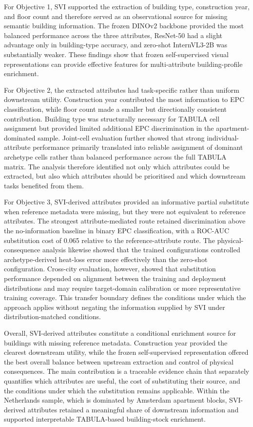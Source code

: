 For Objective 1, SVI supported the extraction of building type, construction year, and floor count and therefore served as an observational source for missing semantic building information. The frozen DINOv2 backbone provided the most balanced performance across the three attributes, ResNet-50 had a slight advantage only in building-type accuracy, and zero-shot InternVL3-2B was substantially weaker. These findings show that frozen self-supervised visual representations can provide effective features for multi-attribute building-profile enrichment.


For Objective 2, the extracted attributes had task-specific rather than uniform downstream utility. Construction year contributed the most information to EPC classification, while floor count made a smaller but directionally consistent contribution. Building type was structurally necessary for TABULA cell assignment but provided limited additional EPC discrimination in the apartment-dominated sample. Joint-cell evaluation further showed that strong individual-attribute performance primarily translated into reliable assignment of dominant archetype cells rather than balanced performance across the full TABULA matrix. The analysis therefore identified not only which attributes could be extracted, but also which attributes should be prioritised and which downstream tasks benefited from them.


For Objective 3, SVI-derived attributes provided an informative partial substitute when reference metadata were missing, but they were not equivalent to reference attributes. The strongest attribute-mediated route retained discrimination above the no-information baseline in binary EPC classification, with a ROC-AUC substitution cost of 0.065 relative to the reference-attribute route. The physical-consequence analysis likewise showed that the trained configurations controlled archetype-derived heat-loss error more effectively than the zero-shot configuration. Cross-city evaluation, however, showed that substitution performance depended on alignment between the training and deployment distributions and may require target-domain calibration or more representative training coverage. This transfer boundary defines the conditions under which the approach applies without negating the information supplied by SVI under distribution-matched conditions.


Overall, SVI-derived attributes constitute a conditional enrichment source for buildings with missing reference metadata. Construction year provided the clearest downstream utility, while the frozen self-supervised representation offered the best overall balance between upstream extraction and control of physical consequences. The main contribution is a traceable evidence chain that separately quantifies which attributes are useful, the cost of substituting their source, and the conditions under which the substitution remains applicable. Within the Netherlands sample, which is dominated by Amsterdam apartment blocks, SVI-derived attributes retained a meaningful share of downstream information and supported interpretable TABULA-based building-stock enrichment.
